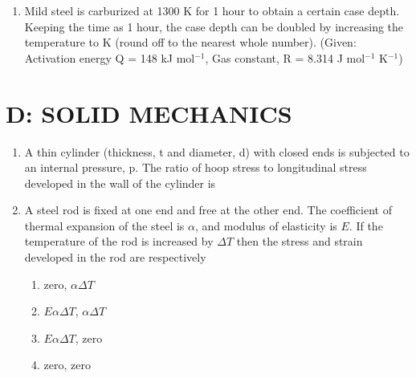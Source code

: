 \documentclass[a4paper,10pt]{article}
\begin{document}
\begin{enumerate}
    \item Mild steel is carburized at 1300 K for 1 hour to obtain a certain case depth. Keeping the time as 1 hour, the case depth can be doubled by increasing the temperature to \underline{\hspace{2cm}} K (round off to the nearest whole number).
    (Given: Activation energy Q = 148 kJ mol$^{-1}$, Gas constant, R = 8.314 J mol$^{-1}$ K$^{-1}$)
    \hfill{}
\end{enumerate}
\clearpage

\section*{D: SOLID MECHANICS}
\begin{enumerate}
    \item A thin cylinder (thickness, t and diameter, d) with closed ends is subjected to an internal pressure, p. The ratio of hoop stress to longitudinal stress developed in the wall of the cylinder is
    \hfill{}
    \begin{enumerate}[label=\Alph*)]
    \end{enumerate}

    \item A steel rod is fixed at one end and free at the other end. The coefficient of thermal expansion of the steel is $\alpha$, and modulus of elasticity is $E$. If the temperature of the rod is increased by $\Delta T$ then the stress and strain developed in the rod are respectively
    \hfill{}
    \begin{enumerate}[label=\Alph*)]
        \item zero, $\alpha\Delta T$
        \item $E\alpha\Delta T$, $\alpha\Delta T$
        \item $E\alpha\Delta T$, zero
        \item zero, zero
    \end{enumerate}


\end{enumerate}
\end{document}
